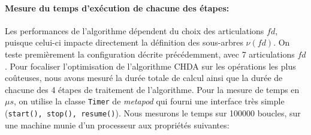 \documentclass{report}
\begin{document}
\paragraph{Mesure du temps d'exécution de chacune des étapes:}
Les performances de l'algorithme dépendent du choix des articulations $fd$, puisque celui-ci impacte directement la définition des sous-arbres $\nu(fd)$. On teste premièrement la configuration décrite précédemment, avec 7 articulations $fd$. Pour focaliser l'optimisation de l'algorithme CHDA sur les opérations les plus coûteuses, nous avons mesuré la durée totale de calcul ainsi que la durée de chacune des 4 étapes de traitement de l'algorithme. Pour la mesure de temps en $\mu s$, on utilise la classe \verb;Timer; de \emph{metapod} qui fourni une interface très simple (\verb;start(), stop(), resume();). Nous mesurons le temps sur 100000 boucles, sur une machine munie d'un processeur aux propriétés suivantes:\\
\end{document}
